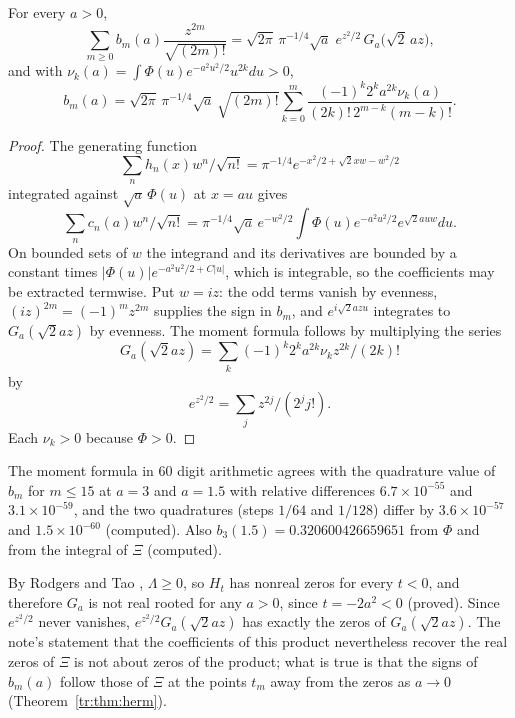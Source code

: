 \begin{theorem}\label{tr:thm:heat}
For every $a>0$,
\[
\sum_{m\ge0}b_m(a)\frac{z^{2m}}{\sqrt{(2m)!}}=\sqrt{2\pi}\,\pi^{-1/4}\sqrt a\;e^{z^2/2}\,G_a\big(\sqrt2\,a z\big),
\]
and with $\nu_k(a)=\int\Phi(u)e^{-a^2u^2/2}u^{2k}du>0$,
\[
b_m(a)=\sqrt{2\pi}\,\pi^{-1/4}\sqrt a\,\sqrt{(2m)!}\sum_{k=0}^m\frac{(-1)^k2^ka^{2k}\nu_k(a)}{(2k)!\,2^{m-k}(m-k)!}.
\]
\end{theorem}

\begin{proof}
The generating function
\[
\sum_nh_n(x)w^n/\sqrt{n!}=\pi^{-1/4}e^{-x^2/2+\sqrt2xw-w^2/2}
\]
integrated against $\sqrt a\,\Phi(u)$ at $x=au$ gives
\[
\sum_nc_n(a)w^n/\sqrt{n!}=\pi^{-1/4}\sqrt a\,e^{-w^2/2}\int\Phi(u)e^{-a^2u^2/2}e^{\sqrt2auw}du.
\]
On bounded sets of $w$ the integrand and its derivatives are bounded by a constant times $|\Phi(u)|e^{-a^2u^2/2+C|u|}$, which is integrable, so the coefficients may be extracted termwise. Put $w=\allowbreak iz$: the odd terms vanish by evenness, $(iz)^{2m}=\allowbreak (-1)^mz^{2m}$ supplies the sign in $b_m$, and $e^{i\sqrt2azu}$ integrates to $G_a(\sqrt2az)$ by evenness. The moment formula follows by multiplying the series
\[
G_a(\sqrt2az)=\sum_k(-1)^k2^ka^{2k}\nu_kz^{2k}/(2k)!
\]
by
\[
e^{z^2/2}=\sum_jz^{2j}/(2^jj!).
\]
Each $\nu_k>0$ because $\Phi>0$.
\end{proof}

The moment formula in $60$ digit arithmetic agrees with the quadrature value of $b_m$ for $m\le15$ at $a=3$ and $a=1.5$ with relative differences $6.7\times10^{-55}$ and $3.1\times10^{-59}$, and the two quadratures (steps $1/64$ and $1/128$) differ by $3.6\times10^{-57}$ and $1.5\times10^{-60}$ (computed). Also $b_3(1.5)=0.320600426659651$ from $\Phi$ and from the integral of $\Xi$ (computed).

\begin{remark}\label{tr:rem:rt}
By Rodgers and Tao \cite{RodgersTao}, $\Lambda\ge0$, so $H_t$ has nonreal zeros for every $t<0$, and therefore $G_a$ is not real rooted for any $a>0$, since $t=-2a^2<0$ (proved). Since $e^{z^2/2}$ never vanishes, $e^{z^2/2}G_a(\sqrt2az)$ has exactly the zeros of $G_a(\sqrt2az)$. The note's statement that the coefficients of this product nevertheless recover the real zeros of $\Xi$ is not about zeros of the product; what is true is that the signs of $b_m(a)$ follow those of $\Xi$ at the points $t_m$ away from the zeros as $a\to0$ (Theorem~\ref{tr:thm:herm}).
\end{remark}

